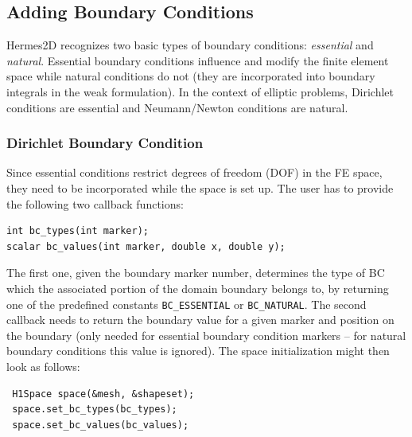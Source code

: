 \documentclass[11pt]{article}
\begin{document}

\subsection{Adding Boundary Conditions}
\label{sec:bc}

Hermes2D recognizes two basic types of boundary conditions: {\em essential} and {\em natural}.
Essential boundary conditions influence and modify the finite element space while natural
conditions do not (they are incorporated into boundary integrals in the weak formulation).
In the context of elliptic problems, Dirichlet conditions are essential and Neumann/Newton
conditions are natural.


\subsubsection{Dirichlet Boundary Condition}

Since essential conditions restrict degrees of freedom (DOF) in the FE space, they need to be
incorporated while the space is set up.
The user has to provide the following two callback functions:

\begin{lstlisting}
int bc_types(int marker);
scalar bc_values(int marker, double x, double y);
\end{lstlisting}

The first one, given the boundary marker number, determines the type of BC which the associated
portion of the domain boundary belongs to, by returning one of the predefined constants \verb"BC_ESSENTIAL"
or \verb"BC_NATURAL". The second callback needs to return the boundary value for a given marker
and position on the boundary (only needed for essential boundary condition markers -- for natural
boundary conditions this value is ignored).
The space initialization might then look as follows:

\begin{lstlisting}
 H1Space space(&mesh, &shapeset);
 space.set_bc_types(bc_types);
 space.set_bc_values(bc_values);
\end{lstlisting}
\end{document}

